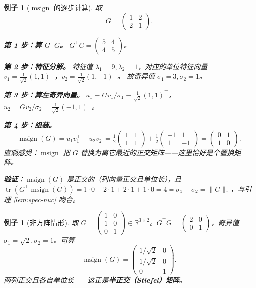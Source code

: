 \documentclass[11pt,a4paper]{article}
\theoremstyle{mythm}
\theoremstyle{mydef}
\newtheorem{example}[theorem]{例子}
\newcommand{\R}{\mathbb{R}}
\newcommand{\tr}{\operatorname{tr}}
\newcommand{\msign}{\operatorname{msign}}
\newcommand{\nuc}{\ast}
\begin{document}
\begin{example}[$\msign$ 的逐步计算]\label{ex:msign-numeric}
取
$$G = \begin{pmatrix} 1 & 2 \\ 2 & 1 \end{pmatrix}.$$

\textbf{第 1 步：算 $G^\top G$。}
$G^\top G = \begin{pmatrix} 5 & 4 \\ 4 & 5\end{pmatrix}$。

\textbf{第 2 步：特征分解。}
特征值 $\lambda_1 = 9,\lambda_2 = 1$，对应的单位特征向量
$v_1 = \tfrac{1}{\sqrt 2}(1,1)^\top$，$v_2 = \tfrac{1}{\sqrt 2}(1,-1)^\top$。
故奇异值 $\sigma_1 = 3,\sigma_2 = 1$。

\textbf{第 3 步：算左奇异向量。}
$u_1 = G v_1/\sigma_1 = \tfrac{1}{\sqrt 2}(1,1)^\top$，
$u_2 = G v_2/\sigma_2 = \tfrac{1}{\sqrt 2}(-1,1)^\top$。

\textbf{第 4 步：组装。}
$$\msign(G) = u_1 v_1^\top + u_2 v_2^\top = \tfrac{1}{2}\begin{pmatrix}1&1\\1&1\end{pmatrix} + \tfrac{1}{2}\begin{pmatrix}-1&1\\1&-1\end{pmatrix} = \begin{pmatrix} 0 & 1\\ 1 & 0\end{pmatrix}.$$
直观感受：$\msign$ 把 $G$ 替换为离它最近的正交矩阵——这里恰好是个置换矩阵。

\textbf{验证}：$\msign(G)$ 是正交的（列向量正交且单位长），且 $\tr(G^\top \msign(G)) = 1\cdot 0 + 2\cdot 1 + 2 \cdot 1 + 1\cdot 0 = 4 = \sigma_1 + \sigma_2 = \|G\|_\nuc$，与引理 \ref{lem:spec-nuc} 吻合。
\end{example}

\begin{example}[非方阵情形]
取 $G = \begin{pmatrix}1 & 0\\ 1 & 0\\ 0 & 1\end{pmatrix} \in \R^{3\times 2}$。$G^\top G = \begin{pmatrix}2 & 0\\ 0 & 1\end{pmatrix}$，奇异值 $\sigma_1 = \sqrt 2,\sigma_2 = 1$。可算
$$\msign(G) = \begin{pmatrix} 1/\sqrt 2 & 0\\ 1/\sqrt 2 & 0 \\ 0 & 1\end{pmatrix}.$$
两列正交且各自单位长——这正是\textbf{半正交（Stiefel）矩阵}。
\end{example}
\end{document}
